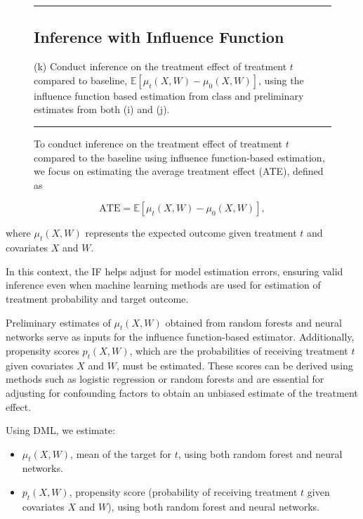 \documentclass{article}
\newenvironment{colorparagraph}[1]{\par\color{#1}}{\par}
\begin{document}
\begin{figure}[H]
\begin{colorparagraph}{questioncolor}
\label{q3k}
\rule{\textwidth}{0.5pt}
\subsection{Inference with Influence Function}
(k) Conduct inference on the treatment effect of treatment \( t \) compared to baseline, \( \mathbb{E}[\mu_t(X, W) - \mu_0(X, W)] \), using the influence function based estimation from class and preliminary estimates from both (i) and (j).

\rule{\textwidth}{0.5pt}
\end{colorparagraph}

To conduct inference on the treatment effect of treatment \( t \) compared to the baseline using influence function-based estimation, we focus on estimating the average treatment effect (ATE), defined as
\end{figure}

\[
\text{ATE} = \mathbb{E}[\mu_t(X, W) - \mu_0(X, W)],
\]

where \( \mu_t(X, W) \) represents the expected outcome given treatment \( t \) and covariates \( X \) and \( W \).

In this context, the IF helps adjust for model estimation errors, ensuring valid inference even when machine learning methods are used for estimation of treatment probability and target outcome.

Preliminary estimates of \( \mu_t(X, W) \) obtained from random forests and neural networks serve as inputs for the influence function-based estimator. Additionally, propensity scores \( p_t(X, W) \), which are the probabilities of receiving treatment \( t \) given covariates \( X \) and \( W \), must be estimated. These scores can be derived using methods such as logistic regression or random forests and are essential for adjusting for confounding factors to obtain an unbiased estimate of the treatment effect.

Using DML, we estimate:

\begin{itemize}
  \item \( \mu_t(X, W) \), mean of the target for $t$, using both random forest and neural networks.
  \item \( p_t(X, W) \), propensity score (probability of receiving treatment $t$ given covariates \( X \) and \( W \)), using both random forest and neural networks.
\end{itemize}
\end{document}
